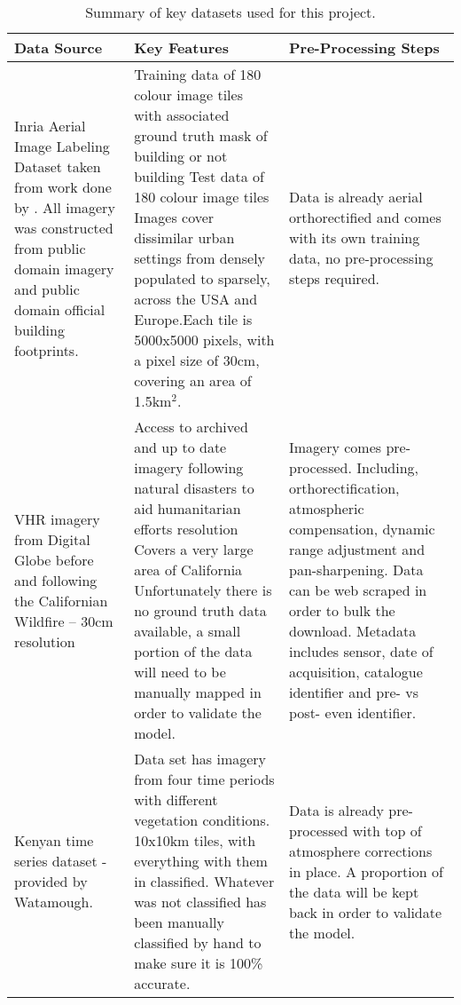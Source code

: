 \begin{table}
    \centering
    \caption{Summary of key datasets used for this project.}
\begin{tabular}{ p{1.5in} p{2in} p{1.5in} }\toprule
\textbf{Data Source}& \textbf{Key Features} & \textbf{Pre-Processing Steps} \\ \toprule
Inria Aerial Image Labeling Dataset taken from work done by \cite{maggiori17a}. All imagery was constructed from public domain imagery and public domain official building footprints. &Training data of 180 colour image tiles with associated ground truth mask of building or not building \newline Test data of 180 colour image tiles \newline Images cover dissimilar urban settings from densely populated to sparsely, across the USA and Europe.\newline Each tile is 5000x5000 pixels, with a pixel size of 30cm, covering an area of 1.5km$^2$. 
& Data is already aerial orthorectified and comes with its own training data, no pre-processing steps required.  \\ \midrule
VHR imagery from Digital Globe before and following the Californian Wildfire – 30cm resolution&
Access to archived and up to date imagery following natural disasters to aid humanitarian efforts \newline
30cm resolution \newline
Covers a very large area of California \newline
Unfortunately there is no ground truth data available, a small portion of the data will need to be manually mapped in order to validate the model.
& Imagery comes pre-processed. Including, orthorectification, atmospheric compensation, dynamic range adjustment and pan-sharpening. \newline
Data can be web scraped in order to bulk the download.\newline
Metadata includes sensor, date of acquisition, catalogue identifier and pre- vs post- even identifier.
\\ \midrule
Kenyan time series dataset - provided by Watamough.& 
Data set has imagery from four time periods with different vegetation conditions. \newline
10x10km tiles, with everything with them in classified. Whatever was not classified has been manually classified by hand to make sure it is 100\% accurate. \newline &
Data is already pre-processed with top of atmosphere corrections in place. A proportion of the data will be kept back in order to validate the model.\\ \bottomrule
\end{tabular}
\label{tab.datasets}
\end{table}

